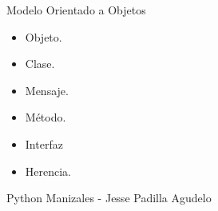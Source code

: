 \begin{frame}{Modelo Orientado a Objetos}
\justifying
\begin{itemize}
\item Objeto.
\item Clase.
\item Mensaje.
\item Método.
\item Interfaz
\item Herencia.
\end{itemize}

{\tiny Python Manizales - Jesse Padilla Agudelo}
\end{frame}
